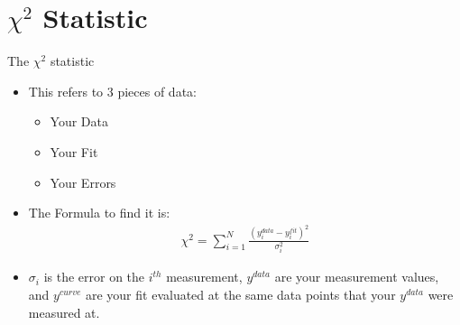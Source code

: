 \documentclass{beamer}
\begin{document}
\section{$\chi^2$ Statistic}
\begin{frame}{The $\chi^2$ statistic}
  \begin{itemize}
  \item This refers to 3 pieces of data:
    \begin{itemize}
    \item Your Data
    \item Your Fit
    \item Your Errors
    \end{itemize}
  \item The Formula to find it is:
    \begin{align*}
      \chi^2=\sum_{i=1}^N\frac{(y_i^{data}-y_i^{fit})^2}{\sigma_i^2}
    \end{align*}
  \item $\sigma_i$ is the error on the $i^{th}$ measurement, $y^{data}$ are your measurement values, and $y^{curve}$ are your fit evaluated at the same data points that your $y^{data}$ were measured at. 
  \end{itemize}
\end{frame}
\end{document}
